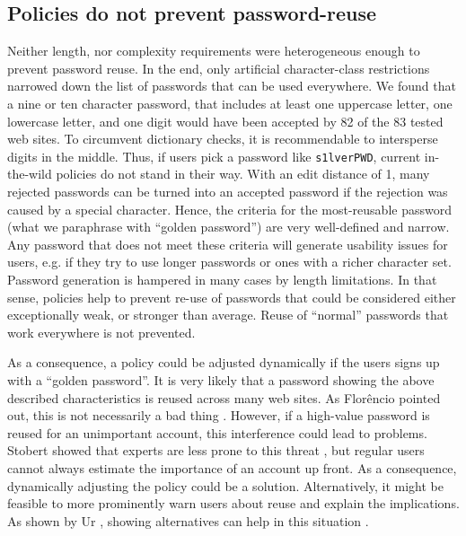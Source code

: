 \subsection{Policies do not prevent password-reuse}
Neither length, nor complexity requirements were heterogeneous enough to prevent password reuse. In the end, only artificial character-class restrictions narrowed down the list of passwords that can be used everywhere. We found that a nine or ten character password, that includes at least one uppercase letter, one lowercase letter, and one digit would have been accepted by 82 of the 83 tested web sites. To circumvent dictionary checks, it is recommendable to intersperse digits in the middle. Thus, if users pick a password like \texttt{s1lverPWD}, current in-the-wild policies do not stand in their way. With an edit distance of 1, many rejected passwords can be turned into an accepted password if the rejection was caused by a special character. Hence, the criteria for the most-reusable password (what we paraphrase with ``golden password'') are very well-defined and narrow. Any password that does not meet these criteria will generate usability issues for users, e.g. if they try to use longer passwords or ones with a richer character set. Password generation is hampered in many cases by length limitations. In that sense, policies help to prevent re-use of passwords that could be considered either exceptionally weak, or stronger than average. Reuse of ``normal'' passwords that work everywhere is not prevented.


As a consequence, a policy could be adjusted dynamically if the users signs up with a ``golden password''. It is very likely that a password showing the above described characteristics is reused across many web sites. As Florêncio \etal pointed out, this is not necessarily a bad thing \cite{Florencio2014PasswordPortfoliosFiniteUser}. However, if a high-value password is reused for an unimportant account, this interference could lead to problems. Stobert showed that experts are less prone to this threat \cite{Stobert2015ExpertPassword}, but regular users cannot always estimate the importance of an account up front. As a consequence, dynamically adjusting the policy could be a solution. Alternatively, it might be feasible to more prominently warn users about reuse and explain the implications. As shown by Ur \etal, showing alternatives can help in this situation \cite{Ur2017DataDrivenPWMeter}. 

